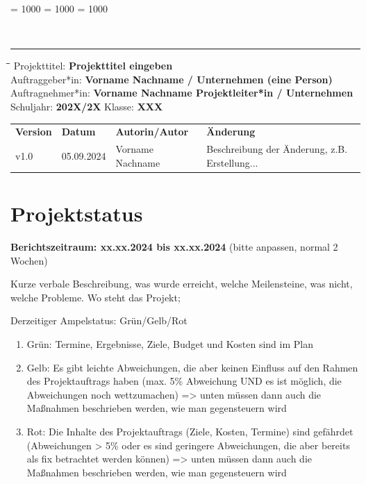 \documentclass[
	headings=optiontotocandhead,%
	oneside,
	numbers=noenddot,%
	toc=flat, %
	10pt, %
	parskip=full, %
	listof=totoc, %
	listof=flat, %
	numbers=noenddot, %
	bibliography=totoc, %
	a4paper,DIV=14,
]{scrartcl}
\newcommand\Tstrut{\rule{0pt}{3.2ex}}         %
\newcommand\Bstrut{\rule[-1.5ex]{0pt}{0pt}}   %
\newenvironment{nstabbing}
	{\setlength{\topsep}{-\parskip}
		\setlength{\partopsep}{-\parskip}
		\tabbing}
	{\endtabbing}
\begin{document}
\clubpenalty = 1000 %
\widowpenalty = 1000 %
\displaywidowpenalty = 1000

{\sffamily{\textbf{\LARGE{\textcolor{orange}{Management Review}}}}}\\
\noindent\rule{\textwidth}{0.1pt}
\begin{nstabbing}
	\hspace{4cm}\=\hspace{4cm}\=\hspace{4cm}\=\kill
	Projekttitel: \> \textbf{Projekttitel eingeben}\\
	Auftraggeber*in: \> \textbf{Vorname Nachname / Unternehmen (eine Person)}\\
	Auftragnehmer*in: \> \textbf{Vorname Nachname Projektleiter*in / Unternehmen}\\
	Schuljahr: \> \textbf{202X/2X}
	\> Klasse: \> \textbf{XXX}\\
\end{nstabbing}
{\smaller
	\begin{tabularx}{\textwidth}{l l l l}
	\hline
	\textbf{Version} & \textbf{Datum} & \textbf{Autorin/Autor} & \textbf{Änderung}\Tstrut  \\
	v1.0 & 05.09.2024 & Vorname Nachname & Beschreibung der Änderung, z.B. Erstellung...\Bstrut \\
	\hline
	\end{tabularx}
}

\section{Projektstatus}
\textbf{Berichtszeitraum: xx.xx.2024 bis xx.xx.2024} (bitte anpassen, normal 2 Wochen)

Kurze verbale Beschreibung, was wurde erreicht, welche Meilensteine, was nicht, welche Probleme. Wo steht das Projekt; 

Derzeitiger Ampelstatus: Grün/Gelb/Rot
\begin{enumerate}
	\item Grün: Termine, Ergebnisse, Ziele, Budget und Kosten sind im Plan
	\item Gelb: Es gibt leichte Abweichungen, die aber keinen Einfluss auf den Rahmen des Projektauftrags haben (max. 5\% Abweichung UND es ist möglich, die Abweichungen noch wettzumachen) => unten müssen dann auch die Maßnahmen beschrieben werden, wie man gegensteuern wird
	\item Rot: Die Inhalte des Projektauftrags (Ziele, Kosten, Termine) sind gefährdet (Abweichungen > 5\% oder es sind geringere Abweichungen, die aber bereits als fix betrachtet werden können) => unten müssen dann auch die Maßnahmen beschrieben werden, wie man gegensteuern wird
\end{enumerate}
\end{document}
